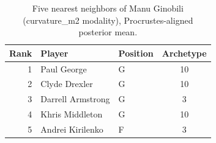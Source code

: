 \begin{table}[htbp]
  \centering\small
  \begin{tabular}{rllc}
    \toprule
    Rank & Player & Position & Archetype \\
    \midrule
    1 & Paul George & G & 10 \\
    2 & Clyde Drexler & G & 10 \\
    3 & Darrell Armstrong & G & 3 \\
    4 & Khris Middleton & G & 10 \\
    5 & Andrei Kirilenko & F & 3 \\
    \bottomrule
  \end{tabular}
  \caption{Five nearest neighbors of Manu Ginobili (curvature_m2 modality), Procrustes-aligned posterior mean.}
  \label{tab:Manu_Ginobili_neighbors_curvature_m2}
\end{table}

